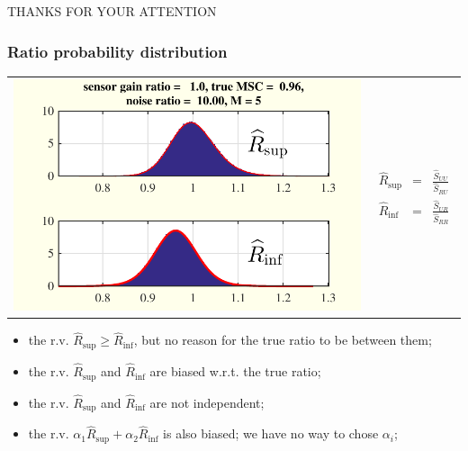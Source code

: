 \documentclass[handout,9pt]{beamer}
\begin{document}
 \begin{frame}
\begin{center}
{\large THANKS FOR YOUR ATTENTION}
\end{center}
\end{frame}

\def\hat{\widehat}
\begin{frame}\frametitle{Ratio probability distribution}
\begin{tabular}{cc}
\begin{minipage}{6cm}
\centering\includegraphics[scale=0.6]{theoreticaldistribratios.pdf}
\end{minipage}
&
\begin{minipage}{4cm}
\begin{eqnarray*}
\hat{R}_{\sup}&=&\frac{\hat{S}_{UU}}{\hat{S}_{RU}}
\\
\hat{R}_{\inf}&=&\frac{\hat{S}_{UR}}{\hat{S}_{RR}}
\end{eqnarray*}
\end{minipage}
\end{tabular}



\begin{itemize}
\item
the r.v. $\hat{R}_{\sup}\geq \hat{R}_{\inf}$, but no reason for the true ratio to be between them;
 \item
the r.v. $\hat{R}_{\sup}$ and $\hat{R}_{\inf}$ are biased w.r.t. the true ratio;
\item
the r.v. $\hat{R}_{\sup}$ and $\hat{R}_{\inf}$ are not independent;
\item
the r.v. $\alpha_{1}\hat{R}_{\sup}+\alpha_{2} \hat{R}_{\inf}$ is also biased; we have no way to chose $\alpha_{i}$;
\end{itemize}
\end{frame}
\end{document}
